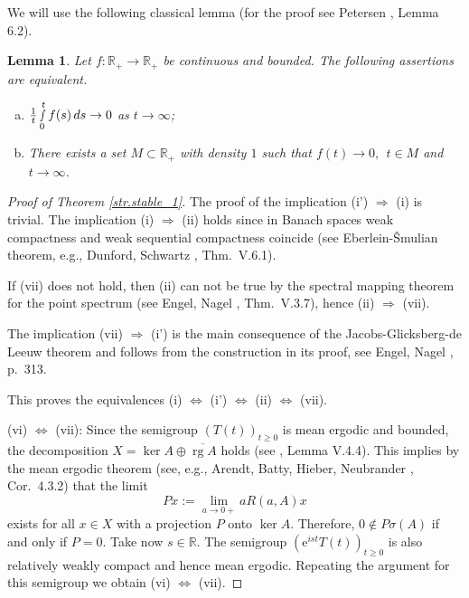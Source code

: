 \documentclass[11pt,intlimits, draft,oneside]{amsart}
\newtheorem{lemma}[thm]{Lemma}
\theoremstyle{definition}
\def\rg{\mathop{\mathrm{rg}}}
\def\dd{\,d}
\def\Psigma{P\sigma}
\def\ee{\mathrm{e}}
\def\RR{\mathbb{R}}
\begin{document}
We will use the following classical lemma (for the proof see
Petersen \cite{petersen:1983}, Lemma 6.2).
%
\begin{lemma}\label{dens1} Let $f:\RR_+ \to \RR_+$ be continuous and bounded. The following
assertions are equivalent.
\begin{enumerate}[(a)]
\item $\displaystyle\tfrac{1}{t}\smallint_0^t f(s)\dd s \to 0$ as $ t\to \infty$;
%
\item There exists a set $M\subset \RR_+$ with density $1$ such that $f(t)\to 0,
\ \ t\in M$ and $t\to \infty$.
\end{enumerate}
\end{lemma}


\noindent
\begin{proof}[Proof of Theorem \ref{str.stable_1}] \rule{0pt}{0pt}

The proof of the implication (i') $\Rightarrow$ (i) is trivial. 
The implication (i) $\Rightarrow$ (ii) holds since in Banach spaces
weak compactness and weak sequential compactness coincide (see
Eberlein-\v Smulian theorem, e.g., Dunford, Schwartz
\cite{dunford/schwartz:1958}, Thm.~V.6.1).


\smallskip\noindent If (vii) does not hold, then (ii) can not be true
by  the spectral mapping theorem for the point spectrum (see Engel,
Nagel \cite{engel/nagel:2000}, Thm.~V.3.7), hence (ii) $\Rightarrow$
(vii).

\smallskip\noindent The implication (vii) $\Rightarrow$ (i') is the
main consequence of the Jacobs-Glicksberg-de Leeuw theorem and
follows from the construction in its proof, see Engel, Nagel
\cite{engel/nagel:2000}, p.~313.

This proves the equivalences (i) $\Leftrightarrow$ (i')
$\Leftrightarrow$ (ii) $\Leftrightarrow$ (vii).


\smallskip\noindent (vi) $\Leftrightarrow$ (vii): Since the semigroup
$(T(t))_{t\geq 0}$ is mean ergodic and bounded, the decomposition
$X=\ker A \oplus \overline{\rg A}$ holds (see \cite{engel/nagel:2000}, Lemma
V.4.4). This implies by the mean ergodic theorem (see, e.g., Arendt,
Batty, Hieber, Neubrander \cite{arendt/etal:2001}, Cor.~4.3.2) that
the limit
%
\begin{equation*}
Px:=\lim_{a\to 0+} aR(a,A)x
\end{equation*}
%
exists for all $x\in X$ with a projection $P$ onto $\ker A$.
Therefore, $0\notin \Psigma (A)$ if and only if $P=0$. Take now
$s\in \RR$. The semigroup $(\ee^{i st}T(t))_{t\geq 0}$ is also
relatively weakly compact and hence mean ergodic. Repeating the
argument for this semigroup we obtain (vi) $\Leftrightarrow$ (vii).



\end{proof}
\end{document}
